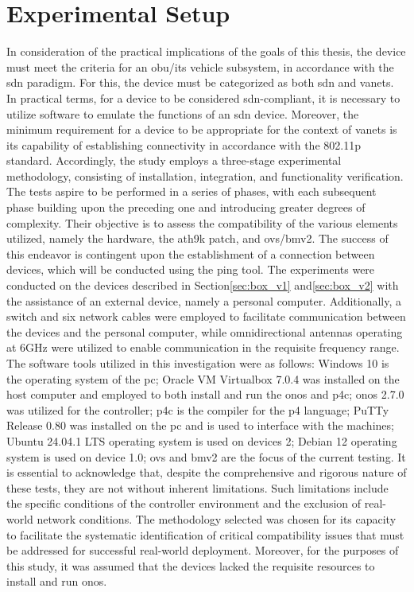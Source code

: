 \section{Experimental Setup}
In consideration of the practical implications of the goals of this thesis, the device must meet the criteria for an \gls{obu}/\gls{its} vehicle subsystem, in accordance with the \gls{sdn} paradigm. For this, the device must be categorized as both \gls{sdn} and \glspl{vanet}. In practical terms, for a device to be considered \gls{sdn}-compliant, it is necessary to utilize software to emulate the functions of an \gls{sdn} device. Moreover, the minimum requirement for a device to be appropriate for the context of \glspl{vanet} is its capability of establishing connectivity in accordance with the 802.11p standard.
Accordingly, the study employs a three-stage experimental methodology, consisting of installation, integration, and functionality verification. The tests aspire to be performed in a series of phases, with each subsequent phase building upon the preceding one and introducing greater degrees of complexity. Their objective is to assess the compatibility of the various elements utilized, namely the hardware, the ath9k patch, and \gls{ovs}/\gls{bmv2}. The success of this endeavor is contingent upon the establishment of a connection between devices, which will be conducted using the ping tool.
The experiments were conducted on the devices described in Section\ref{sec:box_v1} and\ref{sec:box_v2} with the assistance of an external device, namely a personal computer. Additionally, a switch and six network cables were employed to facilitate communication between the devices and the personal computer, while omnidirectional antennas operating at 6GHz were utilized to enable communication in the requisite frequency range.
The software tools utilized in this investigation were as follows:
Windows 10 is the operating system of the \gls{pc};
Oracle VM Virtualbox 7.0.4 was installed on the host computer and employed to both install and run the \gls{onos} and p4c;
\gls{onos} 2.7.0 was utilized for the controller;
p4c is the compiler for the \gls{p4} language;
PuTTy Release 0.80 was installed on the \gls{pc} and is used to interface with the machines;
Ubuntu 24.04.1 LTS operating system is used on devices 2;
Debian 12 operating system is used on device 1.0;
\gls{ovs} and \gls{bmv2} are the focus of the current testing.
It is essential to acknowledge that, despite the comprehensive and rigorous nature of these tests, they are not without inherent limitations. Such limitations include the specific conditions of the controller environment and the exclusion of real-world network conditions. The methodology selected was chosen for its capacity to facilitate the systematic identification of critical compatibility issues that must be addressed for successful real-world deployment. Moreover, for the purposes of this study, it was assumed that the devices lacked the requisite resources to install and run \gls{onos}.


